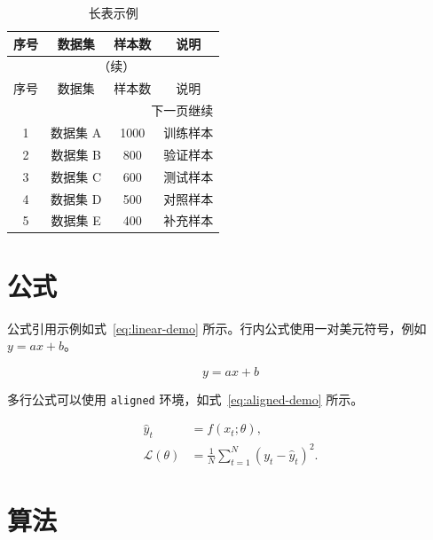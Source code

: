 \documentclass[AutoFakeBold]{LZUThesis_xb}
\begin{document}
\begin{longtable}{cccc}
    \caption{长表示例}\label{tab:long-demo} \\
    \toprule
    序号 & 数据集 & 样本数 & 说明 \\
    \midrule
    \endfirsthead

    \multicolumn{4}{c}{\tablename\ \thetable{}（续）}\\
    \toprule
    序号 & 数据集 & 样本数 & 说明 \\
    \midrule
    \endhead

    \midrule
    \multicolumn{4}{r}{下一页继续}\\
    \endfoot

    \bottomrule
    \endlastfoot

    1 & 数据集 A & 1000 & 训练样本 \\
    2 & 数据集 B & 800 & 验证样本 \\
    3 & 数据集 C & 600 & 测试样本 \\
    4 & 数据集 D & 500 & 对照样本 \\
    5 & 数据集 E & 400 & 补充样本 \\
\end{longtable}

\section{公式}

公式引用示例如式~\eqref{eq:linear-demo} 所示。行内公式使用一对美元符号，例如 $y=ax+b$。

\begin{equation}
    y = ax + b
    \label{eq:linear-demo}
\end{equation}

多行公式可以使用 \verb|aligned| 环境，如式~\eqref{eq:aligned-demo} 所示。

\begin{equation}
    \begin{aligned}
        \hat{y}_t &= f(x_t;\theta), \\
        \mathcal{L}(\theta) &= \frac{1}{N}\sum_{t=1}^{N}(y_t-\hat{y}_t)^2 .
    \end{aligned}
    \label{eq:aligned-demo}
\end{equation}

\section{算法}
\end{document}

